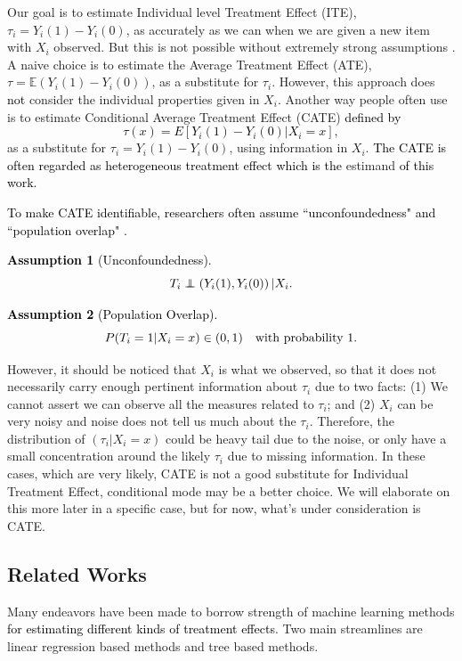 \documentclass[11pt,paper=letter]{scrartcl}
\newtheorem{assumption}{Assumption}
\def\E{\mathbb{E}}
\newcommand\independent{\protect\mathpalette{\protect\independenT}{\perp}}
\def\independenT#1#2{\mathrel{\rlap{$#1#2$}\mkern2mu{#1#2}}}
\newcommand\hz[1]{\textcolor{black}{#1}}
\begin{document}
Our goal is to estimate Individual level Treatment Effect (ITE), $\tau_i = Y_i(1)-Y_i(0)$, as accurately as we can when we are given a new item with $X_i$ observed. But this is not possible without extremely strong assumptions \cite{kunzel2017meta} . A naive choice is to estimate the Average Treatment Effect (ATE), $\tau=\E(Y_i(1)-Y_i(0))$, as a substitute for $\tau_i$. However, this approach does \hz{not} consider the individual properties given in $X_i$. Another way people often use is to estimate Conditional Average Treatment Effect (CATE) \hz{defined by
$$
\tau(x) = E[Y_i(1)-Y_i(0)|X_i=x],
$$ 
}as a substitute for $\tau_i = Y_i(1)-Y_i(0)$, using information in $X_i$. \hz{The CATE is often regarded as heterogeneous treatment effect which is the} estimand \hz{ of this work.} 
 
\hz{To make CATE identifiable, researchers often assume ``unconfoundedness" \cite{rubin1983unconfoundedness} and ``population overlap" \cite{khan2010overlap}.
\begin{assumption}[Unconfoundedness]
$$
T_i \independent \left(  Y_i(1),Y_i(0) \right) | X_i .
$$
\end{assumption}
\begin{assumption}[Population Overlap] 
$$
P(T_i=1|X_i=x) \in (0,1) \quad \textnormal{with probability 1.}
$$
\end{assumption}
}



However, it should be noticed that $X_i$ is what we observed, so that it does not necessarily carry enough pertinent information about $\tau_i$ due to two facts: (1) We cannot assert we can observe all the measures related to $\tau_i$; and (2) $X_i$ can be very noisy and noise does not tell us much about the $\tau_i$. Therefore, the distribution of $(\tau_i | X_i=x)$ could be heavy tail due to the noise, or only have a small concentration around the likely $\tau_i$ due to missing information. In these cases, which are very likely, CATE is not a good substitute for Individual Treatment Effect, conditional mode may be a better choice. We will elaborate on this more later in a specific case, but for now, what's under consideration is CATE.



\subsection{Related Works}
Many endeavors have been made to borrow strength of machine learning methods \hz{for estimating different kinds of treatment effects}. Two main streamlines are linear regression based methods and tree based methods. 
\end{document}
